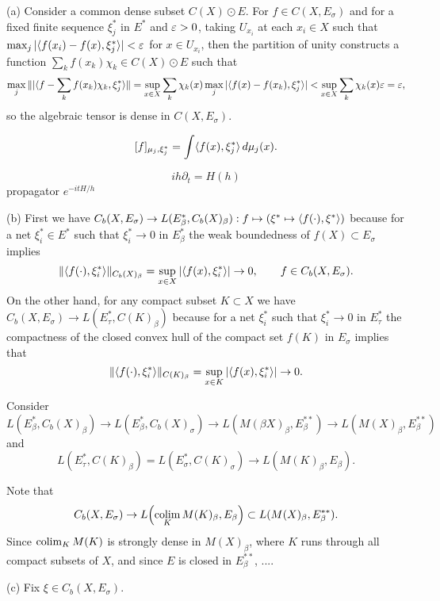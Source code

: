 \documentclass{../../large}
\begin{document}
\begin{pf}
(a)
Consider a common dense subset $C(X)\odot E$.
For $f\in C(X,E_\sigma)$ and for a fixed finite sequence $\xi^*_j$ in $E^*$ and $\varepsilon>0$, taking $U_{x_i}$ at each $x_i\in X$ such that $\max_j|\langle f(x_i)-f(x),\xi_j^*\rangle|<\varepsilon$ for $x\in U_{x_i}$, then the partition of unity constructs a function $\sum_kf(x_k)\chi_k\in C(X)\odot E$ such that
\[\max_j\||\langle f-\sum_kf(x_k)\chi_k,\xi^*_j\rangle\|=\sup_{x\in X}\sum_k\chi_k(x)\max_j|\langle f(x)-f(x_k),\xi^*_j\rangle|<\sup_{x\in X}\sum_k\chi_k(x)\varepsilon=\varepsilon,\]
so the algebraic tensor is dense in $C(X,E_\sigma)$.

\[[f]_{\mu_j,\xi_j^*}=\int\langle f(x),\xi_j^*\rangle\,d\mu_j(x).\]

\[ih\partial_t=H(h)\]
propagator $e^{-itH/h}$

(b)
First we have $C_b(X,E_\sigma)\to L(E^*_\beta,C_b(X)_\beta):f\mapsto(\xi^*\mapsto\langle f(\cdot),\xi^*\rangle)$ because for a net $\xi^*_i\in E^*$ such that $\xi^*_i\to0$ in $E^*_\beta$ the weak boundedness of $f(X)\subset E_\sigma$ implies
\[\|\langle f(\cdot),\xi^*_i\rangle\|_{C_b(X)_\beta}=\sup_{x\in X}|\langle f(x),\xi^*_i\rangle|\to0,\qquad f\in C_b(X,E_\sigma).\]
On the other hand, for any compact subset $K\subset X$ we have $C_b(X,E_\sigma)\to L(E^*_\tau,C(K)_\beta)$ because for a net $\xi_i^*$ such that $\xi^*_i\to0$ in $E^*_\tau$ the compactness of the closed convex hull of the compact set $f(K)$ in $E_\sigma$ implies that
\[\|\langle f(\cdot),\xi^*_i\rangle\|_{C(K)_\beta}=\sup_{x\in K}|\langle f(x),\xi^*_i\rangle|\to0.\]

Consider
\[L(E^*_\beta,C_b(X)_\beta)\to L(E^*_\beta,C_b(X)_\sigma)\to L(M(\beta X)_\beta,E^{**}_\beta)\to L(M(X)_\beta,E^{**}_\beta)\]
and
\[L(E^*_\tau,C(K)_\beta)=L(E^*_\sigma,C(K)_\sigma)\to L(M(K)_\beta,E_\beta).\]

Note that
\[C_b(X,E_\sigma)\to L\Bigl(\operatorname*{colim}_KM(K)_\beta,E_\beta\Bigr)\subset L(M(X)_\beta,E_\beta^{**}).\]
Since $\operatorname*{colim}_KM(K)$ is strongly dense in $M(X)_\beta$, where $K$ runs through all compact subsets of $X$, and since $E$ is closed in $E_\beta^{**}$, ....

(c)
Fix $\xi\in C_b(X,E_\sigma)$.
\end{pf}
\end{document}
